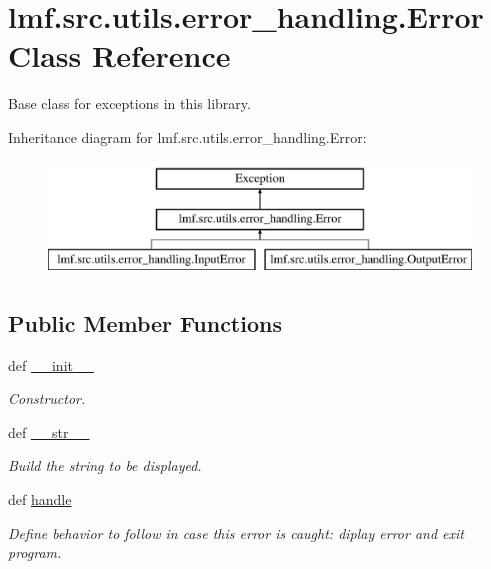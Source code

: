 \hypertarget{classlmf_1_1src_1_1utils_1_1error__handling_1_1_error}{\section{lmf.\+src.\+utils.\+error\+\_\+handling.\+Error Class Reference}
\label{classlmf_1_1src_1_1utils_1_1error__handling_1_1_error}
}


Base class for exceptions in this library.  


Inheritance diagram for lmf.\+src.\+utils.\+error\+\_\+handling.\+Error\+:\begin{figure}[H]
\begin{center}
\leavevmode
\includegraphics[height=3.000000cm]{classlmf_1_1src_1_1utils_1_1error__handling_1_1_error}
\end{center}
\end{figure}
\subsection*{Public Member Functions}
\begin{DoxyCompactItemize}
\item 
def \hyperlink{classlmf_1_1src_1_1utils_1_1error__handling_1_1_error_a7ef901bcd33f6064d695302b1167d811}{\+\_\+\+\_\+init\+\_\+\+\_\+}
\begin{DoxyCompactList}\small\item\em Constructor. \end{DoxyCompactList}\item 
def \hyperlink{classlmf_1_1src_1_1utils_1_1error__handling_1_1_error_a1904e4b7091d08a68e43a0e13b5d10e6}{\+\_\+\+\_\+str\+\_\+\+\_\+}
\begin{DoxyCompactList}\small\item\em Build the string to be displayed. \end{DoxyCompactList}\item 
def \hyperlink{classlmf_1_1src_1_1utils_1_1error__handling_1_1_error_af74fa5546dd2777e4d4b23b84b98cf9d}{handle}
\begin{DoxyCompactList}\small\item\em Define behavior to follow in case this error is caught\+: diplay error and exit program. \end{DoxyCompactList}\end{DoxyCompactItemize}

